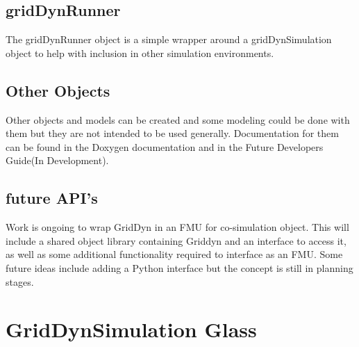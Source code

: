 \documentclass[12pt]{article} %
\begin{document}
\subsection{gridDynRunner }
The gridDynRunner object is a simple wrapper around a gridDynSimulation object to help with inclusion in other simulation environments.

\subsection{Other Objects}
Other objects and models can be created and some modeling could be done with them but they are not intended to be used generally.  Documentation for them can be found in the Doxygen documentation and in the Future Developers Guide(In Development).
\subsection{future API's}
Work is ongoing to wrap GridDyn in an FMU for co-simulation object.  This will include a shared object library containing Griddyn and an interface to access it, as well as some additional functionality required to interface as an FMU.  Some future ideas include adding a Python interface but the concept is still in planning stages.

\section{GridDynSimulation Glass}
\end{document}
